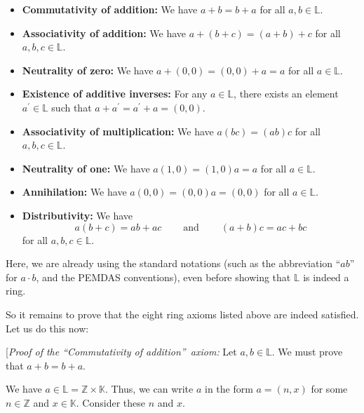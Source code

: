 \documentclass[paper=a4, fontsize=12pt]{scrartcl}%
\theoremstyle{plainsl}
\theoremstyle{definition}
\theoremstyle{remark}
\begin{document}
\begin{itemize}
\item \textbf{Commutativity of addition:} We have $a+b=b+a$ for all
$a,b\in\mathbb{L}$.

\item \textbf{Associativity of addition:} We have $a+\left(  b+c\right)
=\left(  a+b\right)  +c$ for all $a,b,c\in\mathbb{L}$.

\item \textbf{Neutrality of zero:} We have $a+\left(  0,0 \right)  =\left(
0,0 \right)  +a=a$ for all $a\in\mathbb{L}$.

\item \textbf{Existence of additive inverses:} For any $a\in\mathbb{L}$, there
exists an element $a^{\prime}\in\mathbb{L}$ such that $a+a^{\prime}=a^{\prime
}+a=\left(  0,0 \right)  $.

\item \textbf{Associativity of multiplication:} We have $a\left(  bc\right)
=\left(  ab\right)  c$ for all $a,b,c\in\mathbb{L}$.

\item \textbf{Neutrality of one:} We have $a \left(  1,0 \right)  = \left(
1,0 \right)  a=a$ for all $a\in\mathbb{L}$.

\item \textbf{Annihilation:} We have $a\left(  0,0 \right)  = \left(  0,0
\right)  a = \left(  0,0 \right)  $ for all $a\in\mathbb{L}$.

\item \textbf{Distributivity:} We have%
\[
a\left(  b+c\right)  =ab+ac\ \ \ \ \ \ \ \ \ \ \text{and}%
\ \ \ \ \ \ \ \ \ \ \left(  a+b\right)  c=ac+bc
\]
for all $a,b,c\in\mathbb{L}$.
\end{itemize}

Here, we are already using the standard notations (such as the abbreviation
``$ab$'' for $a\cdot b$, and the PEMDAS conventions), even before showing that
$\mathbb{L}$ is indeed a ring.

So it remains to prove that the eight ring axioms listed above are indeed
satisfied. Let us do this now:

[\textit{Proof of the \textquotedblleft Commutativity of
addition\textquotedblright\ axiom:} Let $a,b\in\mathbb{L}$. We must prove that
$a+b=b+a$.

We have $a\in\mathbb{L}=\mathbb{Z}\times\mathbb{K}$. Thus, we can write $a$ in
the form $a=\left(  n,x\right)  $ for some $n\in\mathbb{Z}$ and $x\in
\mathbb{K}$. Consider these $n$ and $x$.
\end{document}
